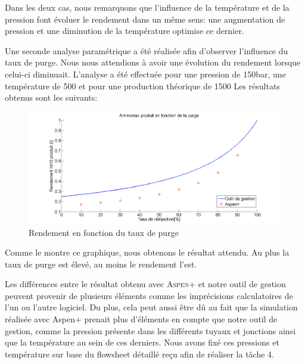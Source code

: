 Dans les deux cas, nous remarquons que l'influence de la température et de la pression font évoluer le rendement dans un même sens: une augmentation de pression et une diminution de la température optimise ce dernier.

Une seconde analyse paramétrique a été réalisée afin d'observer l'influence du taux de purge. Nous nous attendions à avoir une évolution du rendement lorsque celui-ci diminuait. L'analyse a été effectuée pour une pression de \unit{150}{bar}, une température de \unit{500}{\celsius} et pour une production théorique de \unit{1500}{\tonne} Les résultats obtenus sont les suivants:

\begin{figure}[ht!]
 \centering
 \includegraphics[scale=0.35]{GrapheCompPu.png}
 \caption{Rendement en fonction du taux de purge}
 \label{scheme}
\end{figure}

Comme le montre ce graphique, nous obtenons le résultat attendu. Au plus la taux de purge est élevé, au moins le rendement l'est.

Les différences entre le résultat obtenu avec \textsc{Aspen+} et notre outil de gestion peuvent provenir de plusieurs éléments comme les imprécisions calculatoires de l'un ou l'autre logiciel. Du plus, cela peut aussi être dû au fait que la simulation réalisée avec Aspen+ prenait plus d'éléments en compte que notre outil de gestion, comme la pression présente dans les différents tuyaux et jonctions ainsi que la température au sein de ces derniers. Nous avons fixé ces pressions et température sur base du flowsheet détaillé reçu afin de réaliser la tâche 4. 
